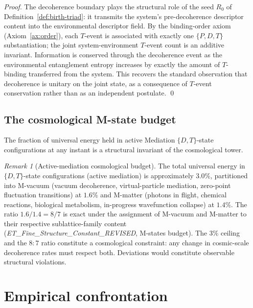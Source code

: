 \documentclass[11pt,a4paper]{article}
\theoremstyle{definition}
\theoremstyle{remark}
\newtheorem{remark}[theorem]{Remark}
\begin{document}
\begin{proof}
The decoherence boundary plays the structural role of the seed $R_{0}$ of Definition~\ref{def:birth-triad}: it transmits the system's pre-decoherence descriptor content into the environmental descriptor field. By the binding-order axiom (Axiom~\ref{ax:order}), each $T$-event is associated with exactly one $\{P,D,T\}$ substantiation; the joint system-environment $T$-event count is an additive invariant. Information is conserved through the decoherence event as the environmental entanglement entropy increases by exactly the amount of $T$-binding transferred from the system. This recovers the standard observation that decoherence is unitary on the joint state, as a consequence of $T$-event conservation rather than as an independent postulate. \qed
\end{proof}

\subsection{The cosmological M-state budget}\label{subsec:M-state-budget}

The fraction of universal energy held in active Mediation $\{D,T\}$-state configurations at any instant is a structural invariant of the cosmological tower.

\begin{remark}[Active-mediation cosmological budget]\label{rem:M-state-budget}
The total universal energy in $\{D,T\}$-state configurations (active mediation) is approximately $3.0\%$, partitioned into M-vacuum (vacuum decoherence, virtual-particle mediation, zero-point fluctuation transitions) at $1.6\%$ and M-matter (photons in flight, chemical reactions, biological metabolism, in-progress wavefunction collapse) at $1.4\%$. The ratio $1.6/1.4 = 8/7$ is exact under the assignment of M-vacuum and M-matter to their respective sublattice-family content (\textit{ET\_Fine\_Structure\_Constant\_REVISED}, M-states budget). The $3\%$ ceiling and the $8{:}7$ ratio constitute a cosmological constraint: any change in cosmic-scale decoherence rates must respect both. Deviations would constitute observable structural violations.
\end{remark}

\section{Empirical confrontation}\label{sec:applications}
\end{document}
